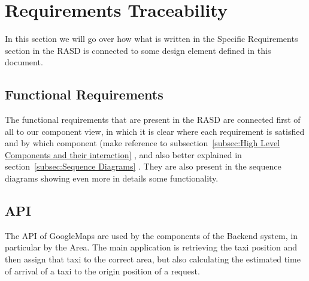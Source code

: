 \section{Requirements Traceability}
In this section we will go over how what is written in the Specific Requirements section in the RASD is connected to some design element defined in this document.
\subsection{Functional Requirements}
The functional requirements that are present in the RASD are connected first of all to our component view, in which it is clear where each requirement is satisfied and by which component (make reference to subsection~\ref{subsec:High Level Components and their interaction} , and also better explained in section~\ref{subsec:Sequence Diagrams} . They are also present in the sequence diagrams showing even more in details some functionality.
\subsection{API}
The API of GoogleMaps are used by the components of the Backend system, in particular by the Area. The main application is retrieving the taxi position and then assign that taxi to the correct area, but also calculating the estimated time of arrival of a taxi to the origin position of a request. 
